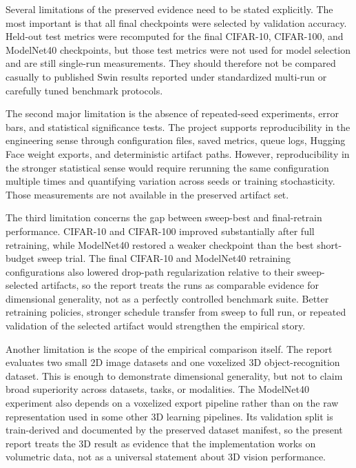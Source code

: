 Several limitations of the preserved evidence need to be stated explicitly. The most important is that all final checkpoints were selected by validation accuracy. Held-out test metrics were recomputed for the final CIFAR-10, CIFAR-100, and ModelNet40 checkpoints, but those test metrics were not used for model selection and are still single-run measurements. They should therefore not be compared casually to published Swin results reported under standardized multi-run or carefully tuned benchmark protocols.

The second major limitation is the absence of repeated-seed experiments, error bars, and statistical significance tests. The project supports reproducibility in the engineering sense through configuration files, saved metrics, queue logs, Hugging Face weight exports, and deterministic artifact paths. However, reproducibility in the stronger statistical sense would require rerunning the same configuration multiple times and quantifying variation across seeds or training stochasticity. Those measurements are not available in the preserved artifact set.

The third limitation concerns the gap between sweep-best and final-retrain performance. CIFAR-10 and CIFAR-100 improved substantially after full retraining, while ModelNet40 restored a weaker checkpoint than the best short-budget sweep trial. The final CIFAR-10 and ModelNet40 retraining configurations also lowered drop-path regularization relative to their sweep-selected artifacts, so the report treats the runs as comparable evidence for dimensional generality, not as a perfectly controlled benchmark suite. Better retraining policies, stronger schedule transfer from sweep to full run, or repeated validation of the selected artifact would strengthen the empirical story.

Another limitation is the scope of the empirical comparison itself. The report evaluates two small 2D image datasets and one voxelized 3D object-recognition dataset. This is enough to demonstrate dimensional generality, but not to claim broad superiority across datasets, tasks, or modalities. The ModelNet40 experiment also depends on a voxelized export pipeline rather than on the raw representation used in some other 3D learning pipelines. Its validation split is train-derived and documented by the preserved dataset manifest, so the present report treats the 3D result as evidence that the implementation works on volumetric data, not as a universal statement about 3D vision performance.

